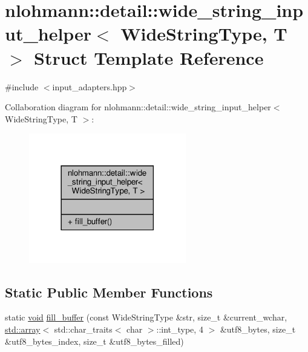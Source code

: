 \hypertarget{structnlohmann_1_1detail_1_1wide__string__input__helper}{}\section{nlohmann\+:\+:detail\+:\+:wide\+\_\+string\+\_\+input\+\_\+helper$<$ Wide\+String\+Type, T $>$ Struct Template Reference}
\label{structnlohmann_1_1detail_1_1wide__string__input__helper}


{\ttfamily \#include $<$input\+\_\+adapters.\+hpp$>$}



Collaboration diagram for nlohmann\+:\+:detail\+:\+:wide\+\_\+string\+\_\+input\+\_\+helper$<$ Wide\+String\+Type, T $>$\+:
\nopagebreak
\begin{figure}[H]
\begin{center}
\leavevmode
\includegraphics[width=194pt]{structnlohmann_1_1detail_1_1wide__string__input__helper__coll__graph}
\end{center}
\end{figure}
\subsection*{Static Public Member Functions}
\begin{DoxyCompactItemize}
\item 
static \hyperlink{namespacenlohmann_1_1detail_a59fca69799f6b9e366710cb9043aa77d}{void} \hyperlink{structnlohmann_1_1detail_1_1wide__string__input__helper_ae82d79118fa319a97e4a40568186a922}{fill\+\_\+buffer} (const Wide\+String\+Type \&str, size\+\_\+t \&current\+\_\+wchar, \hyperlink{namespacenlohmann_1_1detail_a1ed8fc6239da25abcaf681d30ace4985af1f713c9e000f5d3f280adbd124df4f5}{std\+::array}$<$ std\+::char\+\_\+traits$<$ char $>$\+::int\+\_\+type, 4 $>$ \&utf8\+\_\+bytes, size\+\_\+t \&utf8\+\_\+bytes\+\_\+index, size\+\_\+t \&utf8\+\_\+bytes\+\_\+filled)
\end{DoxyCompactItemize}


